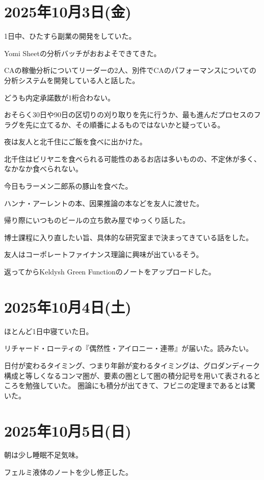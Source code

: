 \documentclass[uplatex]{jsarticle}
\begin{document}
\section{2025年10月3日(金)}

1日中、ひたすら副業の開発をしていた。

Yomi Sheetの分析バッチがおおよそできてきた。

CAの稼働分析についてリーダーの2人、別件でCAのパフォーマンスについての分析システムを開発している人と話した。

どうも内定承諾数が1桁合わない。

おそらく30日や90日の区切りの刈り取りを先に行うか、最も進んだプロセスのフラグを先に立てるか、その順番によるものではないかと疑っている。

夜は友人と北千住にご飯を食べに出かけた。

北千住はビリヤニを食べられる可能性のあるお店は多いものの、不定休が多く、なかなか食べられない。

今日もラーメン二郎系の豚山を食べた。

ハンナ・アーレントの本、因果推論の本などを友人に渡せた。

帰り際にいつものビールの立ち飲み屋でゆっくり話した。

博士課程に入り直したい旨、具体的な研究室まで決まってきている話をした。

友人はコーポレートファイナンス理論に興味が出ているそう。

返ってからKeldysh Green Functionのノートをアップロードした。

\section{2025年10月4日(土)}

ほとんど1日中寝ていた日。

リチャード・ローティの『偶然性・アイロニー・連帯』が届いた。読みたい。

日付が変わるタイミング、つまり年齢が変わるタイミングは、グロダンディーク構成と等しくなるコンマ圏が、要素の圏として圏の積分記号を用いて表されるところを勉強していた。
圏論にも積分が出てきて、フビニの定理まであるとは驚いた。


\section{2025年10月5日(日)}

朝は少し睡眠不足気味。

フェルミ液体のノートを少し修正した。
\end{document}
